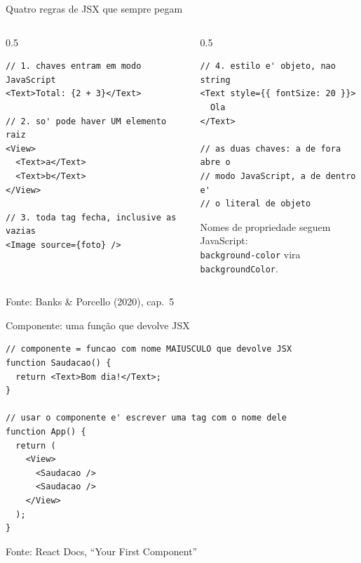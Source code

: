 \documentclass[aspectratio=169]{beamer}
\newcommand{\fonte}[1]{\vfill\hfill{\scriptsize\textcolor{UFSGray}{Fonte: #1}}}
\begin{document}
\begin{frame}[fragile]{Quatro regras de JSX que sempre pegam}
  \begin{columns}[T]
    \begin{column}{0.5\textwidth}
\begin{lstlisting}[style=jsx]
// 1. chaves entram em modo JavaScript
<Text>Total: {2 + 3}</Text>

// 2. so' pode haver UM elemento raiz
<View>
  <Text>a</Text>
  <Text>b</Text>
</View>

// 3. toda tag fecha, inclusive as vazias
<Image source={foto} />
\end{lstlisting}
    \end{column}
    \begin{column}{0.5\textwidth}
\begin{lstlisting}[style=jsx]
// 4. estilo e' objeto, nao string
<Text style={{ fontSize: 20 }}>
  Ola
</Text>

// as duas chaves: a de fora abre o
// modo JavaScript, a de dentro e'
// o literal de objeto
\end{lstlisting}
      \medskip
      \small
      Nomes de propriedade seguem JavaScript:\\
      \texttt{background-color} vira \texttt{backgroundColor}.
    \end{column}
  \end{columns}
  \fonte{Banks \& Porcello (2020), cap.\ 5~\cite{banks2020learning}}
\end{frame}

\begin{frame}[fragile]{Componente: uma função que devolve JSX}
\begin{lstlisting}[style=js]
// componente = funcao com nome MAIUSCULO que devolve JSX
function Saudacao() {
  return <Text>Bom dia!</Text>;
}

// usar o componente e' escrever uma tag com o nome dele
function App() {
  return (
    <View>
      <Saudacao />
      <Saudacao />
    </View>
  );
}
\end{lstlisting}
  \fonte{React Docs, ``Your First Component''~\cite{react2025docs}}
\end{frame}
\end{document}
